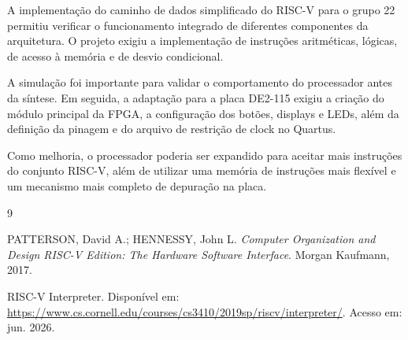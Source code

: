 \documentclass[12pt,a4paper]{article}
\begin{document}
A implementação do caminho de dados simplificado do RISC-V para o grupo 22 permitiu verificar o funcionamento integrado de diferentes componentes da arquitetura. O projeto exigiu a implementação de instruções aritméticas, lógicas, de acesso à memória e de desvio condicional.

A simulação foi importante para validar o comportamento do processador antes da síntese. Em seguida, a adaptação para a placa DE2-115 exigiu a criação do módulo principal da FPGA, a configuração dos botões, displays e LEDs, além da definição da pinagem e do arquivo de restrição de clock no Quartus.

Como melhoria, o processador poderia ser expandido para aceitar mais instruções do conjunto RISC-V, além de utilizar uma memória de instruções mais flexível e um mecanismo mais completo de depuração na placa.

\begin{thebibliography}{9}

PATTERSON, David A.; HENNESSY, John L. \textit{Computer Organization and Design RISC-V Edition: The Hardware Software Interface}. Morgan Kaufmann, 2017.

RISC-V Interpreter. Disponível em: \url{https://www.cs.cornell.edu/courses/cs3410/2019sp/riscv/interpreter/}. Acesso em: jun. 2026.

\end{thebibliography}
\end{document}
